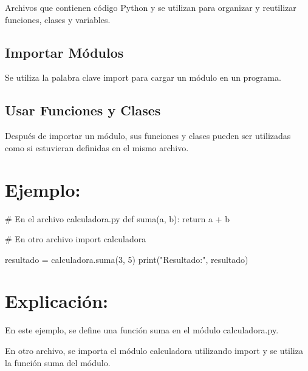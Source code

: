 \documentclass[
  a4paper,
  DIV=11,
  numbers=noendperiod,
  onepage,
  openany]{scrreprt}
\newenvironment{Shaded}{\begin{snugshade}}{\end{snugshade}}
\newcommand{\BuiltInTok}[1]{\textcolor[rgb]{0.00,0.23,0.31}{#1}}
\newcommand{\CommentTok}[1]{\textcolor[rgb]{0.37,0.37,0.37}{#1}}
\newcommand{\ControlFlowTok}[1]{\textcolor[rgb]{0.00,0.23,0.31}{#1}}
\newcommand{\DecValTok}[1]{\textcolor[rgb]{0.68,0.00,0.00}{#1}}
\newcommand{\ImportTok}[1]{\textcolor[rgb]{0.00,0.46,0.62}{#1}}
\newcommand{\KeywordTok}[1]{\textcolor[rgb]{0.00,0.23,0.31}{#1}}
\newcommand{\NormalTok}[1]{\textcolor[rgb]{0.00,0.23,0.31}{#1}}
\newcommand{\OperatorTok}[1]{\textcolor[rgb]{0.37,0.37,0.37}{#1}}
\newcommand{\StringTok}[1]{\textcolor[rgb]{0.13,0.47,0.30}{#1}}
\begin{document}
Archivos que contienen código Python y se utilizan para organizar y
reutilizar funciones, clases y variables.

\hypertarget{importar-muxf3dulos}{%
\subsection{Importar Módulos}\label{importar-muxf3dulos}}

Se utiliza la palabra clave import para cargar un módulo en un programa.

\hypertarget{usar-funciones-y-clases}{%
\subsection{Usar Funciones y Clases}\label{usar-funciones-y-clases}}

Después de importar un módulo, sus funciones y clases pueden ser
utilizadas como si estuvieran definidas en el mismo archivo.

\hypertarget{ejemplo-58}{%
\section{Ejemplo:}\label{ejemplo-58}}

\begin{Shaded}
\begin{Highlighting}[]
\CommentTok{\# En el archivo calculadora.py}
\KeywordTok{def}\NormalTok{ suma(a, b):}
    \ControlFlowTok{return}\NormalTok{ a }\OperatorTok{+}\NormalTok{ b}

\CommentTok{\# En otro archivo}
\ImportTok{import}\NormalTok{ calculadora}

\NormalTok{resultado }\OperatorTok{=}\NormalTok{ calculadora.suma(}\DecValTok{3}\NormalTok{, }\DecValTok{5}\NormalTok{)}
\BuiltInTok{print}\NormalTok{(}\StringTok{"Resultado:"}\NormalTok{, resultado)}
\end{Highlighting}
\end{Shaded}

\hypertarget{explicaciuxf3n-58}{%
\section{Explicación:}\label{explicaciuxf3n-58}}

En este ejemplo, se define una función suma en el módulo calculadora.py.

En otro archivo, se importa el módulo calculadora utilizando import y se
utiliza la función suma del módulo.
\end{document}
